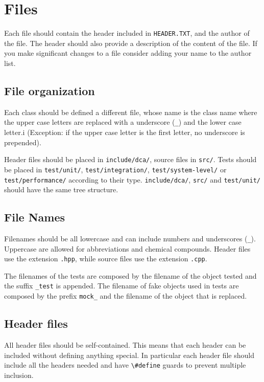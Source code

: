 \documentclass[a4paper]{article}
\newcommand{\inlinecode}[1]{\lstinline|#1|}
\begin{document}
\tableofcontents

\section{Files}
Each file should contain the header included in \inlinecode{HEADER.TXT}, and the author of the file.
The header should also provide a description of the content of the file.
If you make significant changes to a file consider adding your name to the author list.

\subsection{File organization}
Each class should be defined a different file, whose name is the class name where the upper case letters are replaced with a underscore (\inlinecode{_}) and the lower case letter.i (Exception: if the upper case letter is the first letter, no underscore is prepended).

Header files should be placed in \verb|include/dca/|, source files in \verb|src/|. Tests should be placed in \verb|test/unit/|, \verb|test/integration/|, \verb|test/system-level/| or \verb|test/performance/| according to their type. \verb|include/dca/|, \verb|src/| and \verb|test/unit/| should have the same tree structure.

\subsection{File Names}
Filenames should be all lowercase and can include numbers and underscores (\inlinecode{_}). Uppercase are allowed for abbreviations and chemical compounds.
Header files use the extension \verb|.hpp|, while source files use the extension \verb|.cpp|.

The filenames of the tests are composed by the filename of the object tested and the suffix \inlinecode{_test} is appended.
The filename of fake objects used in tests are composed by the prefix \inlinecode{mock_} and the filename of the object that is replaced.

\subsection{Header files}
All header files should be self-contained. This means that each header can be included without defining anything special.
In particular each header file should include all the headers needed and have \inlinecode{\#define} guards to prevent multiple inclusion.
\end{document}

